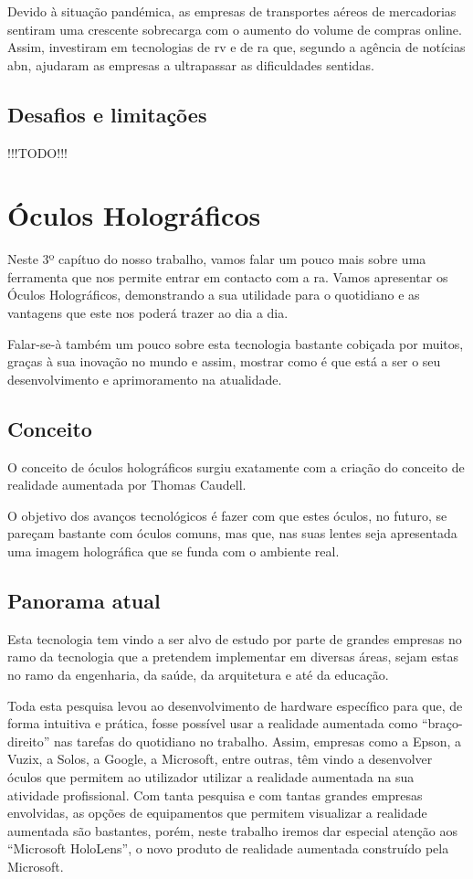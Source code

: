 \documentclass{report}
\begin{document}
Devido à situação pandémica, as empresas de transportes aéreos de mercadorias sentiram uma crescente sobrecarga com o aumento do volume de compras online. Assim, investiram em tecnologias de \ac{rv} e de \ac{ra} que, segundo a agência de notícias \ac{abn}, ajudaram as empresas a ultrapassar as dificuldades sentidas.\cite{moody_2020}

\section{Desafios e limitações}
!!!TODO!!!

\chapter{Óculos Holográficos}
\label{chap.oculos-holograficos}
Neste 3º capítuo do nosso trabalho, vamos falar um pouco mais sobre uma ferramenta que nos permite entrar em contacto com a \ac{ra}. Vamos apresentar os Óculos Holográficos, demonstrando a sua utilidade para o quotidiano e as vantagens que este nos poderá trazer ao dia a dia. 

Falar-se-à também um pouco sobre esta tecnologia bastante cobiçada por muitos, graças à sua inovação no mundo e assim, mostrar como é que está a ser o seu desenvolvimento e aprimoramento na atualidade.

\section{Conceito}
O conceito de óculos holográficos surgiu exatamente com a criação do conceito de realidade aumentada por Thomas Caudell.

O objetivo dos avanços tecnológicos é fazer com que estes óculos, no futuro, se pareçam bastante com óculos comuns, mas que, nas suas lentes seja apresentada uma
imagem holográfica que se funda com o ambiente real.

\section{Panorama atual}
Esta tecnologia tem vindo a ser alvo de estudo por parte de grandes empresas no ramo da tecnologia que a pretendem implementar em diversas áreas, sejam estas no ramo da engenharia, da saúde, da arquitetura e até da educação.

Toda esta pesquisa levou ao desenvolvimento de hardware específico para que, de forma intuitiva e prática, fosse possível usar a realidade aumentada como “braço-direito” nas tarefas do quotidiano no trabalho. Assim, empresas como a Epson, a Vuzix, a Solos, a Google, a Microsoft, entre outras, têm vindo a desenvolver óculos que permitem ao utilizador utilizar a realidade aumentada na sua atividade profissional. Com tanta pesquisa e com tantas grandes empresas envolvidas, as opções de equipamentos que permitem visualizar a realidade aumentada são bastantes, porém, neste trabalho iremos dar especial atenção aos “Microsoft HoloLens”, o novo produto de realidade aumentada construído pela Microsoft.
\end{document}
